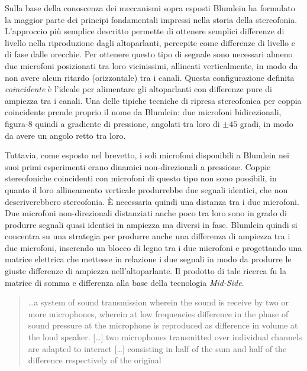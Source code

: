 Sulla base della conoscenza dei meccanismi sopra esposti Blumlein ha formulato
la maggior parte dei principi fondamentali impressi nella storia della stereofonia.
L'approccio più semplice descritto permette di ottenere semplici differenze di
livello nella riproduzione dagli altoparlanti, percepite come differenze di
livello e di fase dalle orecchie. Per ottenere questo tipo di segnale sono
necessari almeno due microfoni posizionati tra loro vicinissimi, allineati
verticalmente, in modo da non avere alcun ritardo (orizzontale) tra i canali.
Questa configurazione definita \emph{coincidente} è l'ideale per alimentare
gli altoparlanti con differenze pure di ampiezza tra i canali. Una delle tipiche
tecniche di ripresa stereofonica per coppia coincidente prende proprio il nome
da Blumlein: due microfoni bidirezionali, figura-8 quindi a gradiente di pressione,
angolati tra loro di $\pm45$ gradi, in modo da avere un angolo retto tra loro.

Tuttavia, come esposto nel brevetto, i soli microfoni disponibili a Blumlein nei
suoi primi esperimenti erano dinamici non-direzionali a pressione. Coppie
stereofoniche coincidenti con microfoni di questo tipo non sono possibili, in
quanto il loro allineamento verticale produrrebbe due segnali identici, che non
descriverebbero stereofonia. È necessaria quindi una distanza tra i due microfoni.
Due microfoni non-direzionali distanziati anche poco tra loro sono in grado di
produrre segnali quasi identici in ampiezza ma diversi in fase. Blumlein quindi
si concentra su una strategia per produrre anche una differenza di ampiezza tra
i due microfoni, inserendo un blocco di legno tra i due microfoni e progettando
una matrice elettrica che mettesse in relazione i due segnali in modo da
produrre le giuste differenze di ampiezza nell'altoparlante. Il prodotto di tale
ricerca fu la matrice di somma e differenza alla base della tecnologia
\emph{Mid-Side}.

\begin{quote}
\ldots a system of sound transmission wherein the sound
is receive by two or more microphones, wherein at low frequencies difference in
the phase of sound pressure at the microphone is reproduced as difference in
volume at the loud speaker. [\ldots] two microphones transmitted over individual
channels are adapted to interact [\ldots] consisting in half of the sum and half
of the difference respectively of the original \cite{ab58}
\end{quote}


